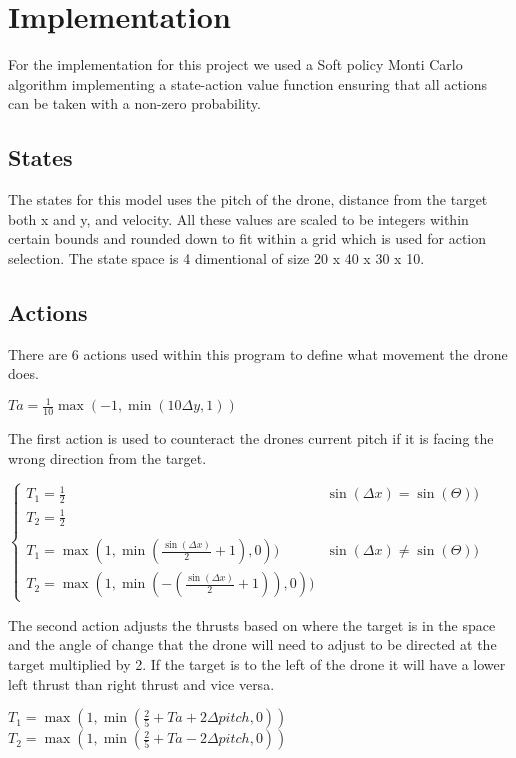 \section{Implementation}
For the implementation for this project we used a Soft policy Monti Carlo algorithm implementing a state-action value function ensuring that all actions can be taken with a non-zero probability. 

\subsection{States}
The states for this model uses the pitch of the drone, distance from the target both x and y, and velocity. All these values are scaled to be integers within certain bounds and rounded down to fit within a grid which is used for action selection.  
The state space is 4 dimentional of size 20 x 40 x 30 x 10. 
\subsection{Actions}
There are 6 actions used within this program to define what movement the drone does.

\begingroup\centering
$Ta =  \frac{1}{10}\max (-1,\min (10\Delta y,1))$

\endgroup


The first action is used to counteract the drones current pitch if it is facing the wrong direction from the target. 

\begingroup\centering
$\left\{\begin{matrix}
    T_1 = \frac{1}{2} & \sin(\Delta x) = \sin(\Theta ))
    & \\
    T_2 = \frac{1}{2}
    \\ \\
    T_1 = \max (1,\min (\frac{\sin (\Delta x)}{2}+1),0)) & \sin(\Delta x) \neq \sin(\Theta ))
    & \\
    T_2 = \max (1,\min (-(\frac{\sin (\Delta x)}{2}+1)),0))
    \end{matrix}\right.$

\endgroup

The second action adjusts the thrusts based on where the target is in the space and the angle of change that the drone will need to adjust to be directed at the target multiplied by 2. If the target is to the left of the drone it will have a lower left thrust than right thrust and vice versa. 

\begingroup\centering
$T_1 = \max (1,\min (\frac{2}{5}+Ta+2\Delta pitch,0))$
$T_2 = \max (1,\min (\frac{2}{5}+Ta-2\Delta pitch,0))$

